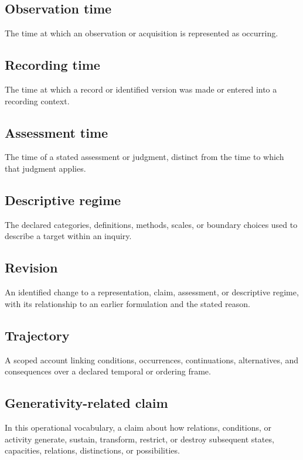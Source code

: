\documentclass[11pt,a4paper]{article}
\begin{document}
\subsection{Observation time}
The time at which an observation or acquisition is represented as occurring.

\subsection{Recording time}
The time at which a record or identified version was made or entered into a recording context.

\subsection{Assessment time}
The time of a stated assessment or judgment, distinct from the time to which that judgment applies.

\subsection{Descriptive regime}
The declared categories, definitions, methods, scales, or boundary choices used to describe a target within an inquiry.

\subsection{Revision}
An identified change to a representation, claim, assessment, or descriptive regime, with its relationship to an earlier formulation and the stated reason.

\subsection{Trajectory}
A scoped account linking conditions, occurrences, continuations, alternatives, and consequences over a declared temporal or ordering frame.

\subsection{Generativity-related claim}
In this operational vocabulary, a claim about how relations, conditions, or activity generate, sustain, transform, restrict, or destroy subsequent states, capacities, relations, distinctions, or possibilities.
\end{document}
